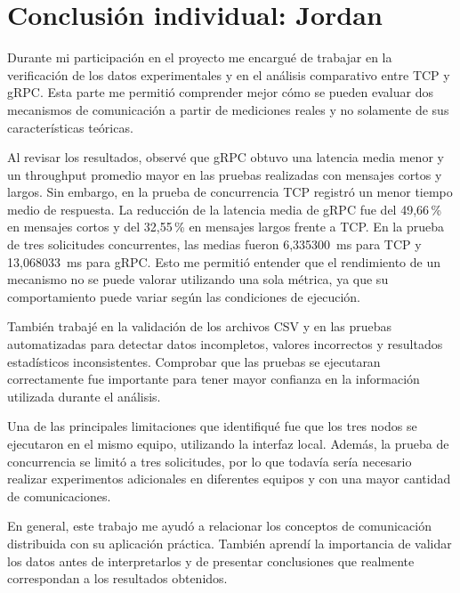 
\section{Conclusión individual: Jordan}

Durante mi participación en el proyecto me encargué de trabajar en la
verificación de los datos experimentales y en el análisis comparativo
entre TCP y gRPC. Esta parte me permitió comprender mejor cómo se
pueden evaluar dos mecanismos de comunicación a partir de mediciones
reales y no solamente de sus características teóricas.

Al revisar los resultados, observé que gRPC obtuvo una latencia media
menor y un throughput promedio mayor en las pruebas realizadas con
mensajes cortos y largos. Sin embargo, en la prueba de concurrencia
TCP registró un menor tiempo medio de respuesta. La reducción de la latencia
media de gRPC fue del 49,66\,\% en mensajes
cortos y del 32,55\,\% en mensajes largos frente a TCP. En la prueba de tres
solicitudes concurrentes, las medias fueron 6,335300~ms para TCP y
13,068033~ms para gRPC. Esto me permitió
entender que el rendimiento de un mecanismo no se puede valorar
utilizando una sola métrica, ya que su comportamiento puede variar
según las condiciones de ejecución.

También trabajé en la validación de los archivos CSV y en las pruebas
automatizadas para detectar datos incompletos, valores incorrectos
y resultados estadísticos inconsistentes. Comprobar que las pruebas
se ejecutaran correctamente fue importante para tener mayor confianza
en la información utilizada durante el análisis.

Una de las principales limitaciones que identifiqué fue que los tres
nodos se ejecutaron en el mismo equipo, utilizando la interfaz local.
Además, la prueba de concurrencia se limitó a tres solicitudes, por
lo que todavía sería necesario realizar experimentos adicionales
en diferentes equipos y con una mayor cantidad de comunicaciones.

En general, este trabajo me ayudó a relacionar los conceptos de
comunicación distribuida con su aplicación práctica. También aprendí
la importancia de validar los datos antes de interpretarlos y de
presentar conclusiones que realmente correspondan a los resultados
obtenidos.
